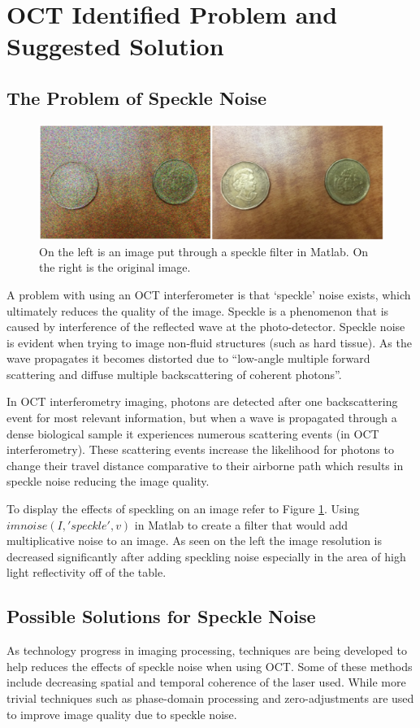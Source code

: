 \documentclass{article}
\begin{document}
	\section{\label{sec:level1}OCT Identified Problem and Suggested Solution}
	\subsection{\label{sec:level2} The Problem of Speckle Noise}
	\begin{figure}
		\centering
		\includegraphics[width=0.7\linewidth]{Figures/specklefilter2}
		\caption{On the left is an image put through a speckle filter in Matlab. On the right is the original image.}
		\label{fig:specklefilter2}
	\end{figure}
	A problem with using an OCT interferometer is that ‘speckle’ noise exists, which ultimately reduces the quality of the image. Speckle is a phenomenon that is caused by interference of the reflected wave at the photo-detector. Speckle noise is evident when trying to image non-fluid structures (such as hard tissue). As the wave propagates it becomes distorted due to “low-angle multiple forward scattering and diffuse multiple backscattering of coherent photons”. \cite{Popescu2007}

	In OCT interferometry imaging, photons are detected after one backscattering event for most relevant information, but when a wave is propagated through a dense biological sample it experiences numerous scattering events (in OCT interferometry). These scattering events increase the likelihood for photons to change their travel distance comparative to their airborne path which results in speckle noise reducing the image quality. \cite{Popescu2007}

	To display the effects of speckling on an image refer to Figure \ref{fig:specklefilter2}. Using $imnoise(I,'speckle',v)$ in Matlab to create a filter that would add multiplicative noise to an image. As seen on the left the image resolution is decreased significantly after adding speckling noise especially in the area of high light reflectivity off of the table.

	\subsection{\label{sec:level2} Possible Solutions for Speckle Noise}
	As technology progress in imaging processing, techniques are being developed to help reduces the effects of speckle noise when using OCT. Some of these methods include decreasing spatial and temporal coherence of the laser used. While more trivial techniques such as phase-domain processing and zero-adjustments are used to improve image quality due to speckle noise. \cite{Popescu2007}
\end{document}

